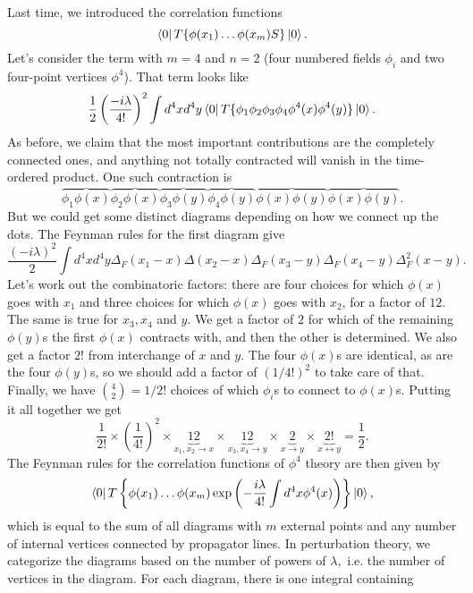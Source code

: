 
Last time, we introduced the correlation functions
$$\left< 0 \right|T\{\phi(x_1)\ldots \phi(x_m) S\}\left| 0 \right>.$$
Let's consider the term with $m=4$ and $n=2$ (four numbered fields $\phi_i$ and two four-point vertices $\phi^4$). That term looks like
$$\frac{1}{2} \left(\frac{-i\lambda}{4!}\right)^2 \int d^4x d^4 y \left< 0 \right|T\{\phi_1 \phi_2 \phi_3 \phi_4 \phi^4(x) \phi^4(y)\}\left| 0 \right>.$$
As before, we claim that the most important contributions are the completely connected ones, and anything not totally contracted will vanish in the time-ordered product. One such contraction is
$$\overbrace{\phi_1 \phi(x)}\overbrace{\phi_2 \phi(x)} \overbrace{\phi_3 \phi(y)} \overbrace{\phi_4 \phi(y)} \overbrace{\phi(x)\phi(y)}\overbrace{\phi(x)\phi(y)}.$$
But we could get some distinct diagrams depending on how we connect up the dots. The Feynman rules for the first diagram %
give
$$\frac{(-i\lambda)^2}{2}\int d^4x d^4 y \Delta_F(x_1-x)\Delta (x_2-x)\Delta_F(x_3-y) \Delta_F(x_4-y) \Delta_F^2(x-y).$$
Let's work out the combinatoric factors: there are four choices for which $\phi(x)$ goes with $x_1$ and three choices for which $\phi(x)$ goes with $x_2$, for a factor of $12$. The same is true for $x_3,x_4$ and $y$. We get a factor of $2$ for which of the remaining $\phi(y)$s the first $\phi(x)$ contracts with, and then the other is determined. We also get a factor $2!$ from interchange of $x$ and $y$. The four $\phi(x)$s are identical, as are the four $\phi(y)$s, so we should add a factor of $(1/4!)^2$ to take care of that. Finally, we have ${4\choose 2}=1/2!$ choices of which $\phi_i$s to connect to $\phi(x)$s. Putting it all together we get
$$\frac{1}{2!}\times \left(\frac{1}{4!}\right)^2 \times \underbrace{12}_{x_1,x_2\to x} \times \underbrace{12}_{x_3,x_4\to y} \times \underbrace{2}_{x\to y} \times \underbrace{2!}_{x\leftrightarrow y} = \frac{1}{2}.$$
The Feynman rules for the correlation functions of $\phi^4$ theory are then given by
$$\left< 0 \right|T\left\{\phi(x_1)\ldots \phi(x_m)  \exp\left(-\frac{i\lambda}{4!}\int d^4x \phi^4 (x)\right)\right\}\left| 0 \right>,$$ which is equal to the sum of all diagrams with $m$ external points and any number of internal vertices connected by propagator lines. In perturbation theory, we categorize the diagrams based on the number of powers of $\lambda,$ i.e. the number of vertices in the diagram. For each diagram, there is one integral containing
